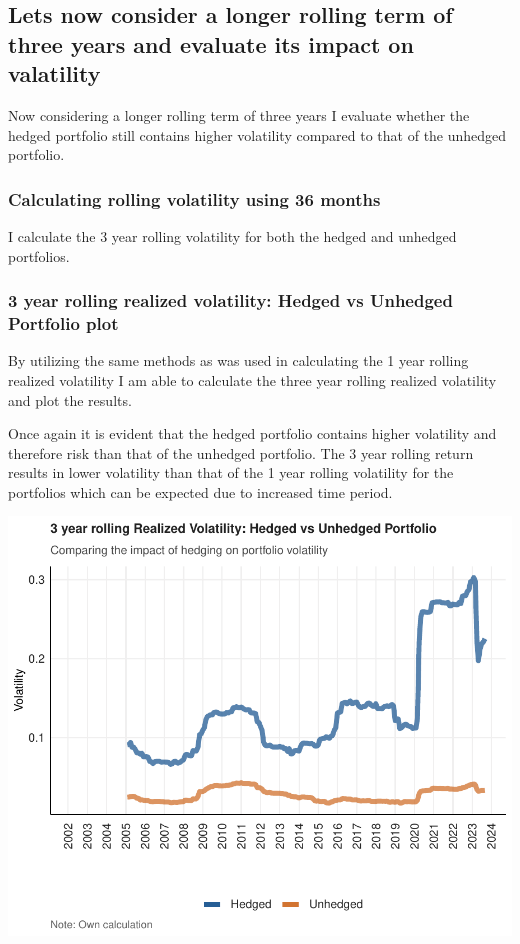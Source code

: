 \documentclass[11pt,preprint, authoryear]{elsarticle}
\numberwithin{equation}{section}
\numberwithin{figure}{section}
\numberwithin{table}{section}
\begin{document}
\hypertarget{lets-now-consider-a-longer-rolling-term-of-three-years-and-evaluate-its-impact-on-valatility}{%
\subsection{Lets now consider a longer rolling term of three years and
evaluate its impact on
valatility}\label{lets-now-consider-a-longer-rolling-term-of-three-years-and-evaluate-its-impact-on-valatility}}

Now considering a longer rolling term of three years I evaluate whether
the hedged portfolio still contains higher volatility compared to that
of the unhedged portfolio.

\hypertarget{calculating-rolling-volatility-using-36-months}{%
\subsubsection{Calculating rolling volatility using 36
months}\label{calculating-rolling-volatility-using-36-months}}

I calculate the 3 year rolling volatility for both the hedged and
unhedged portfolios.

\hypertarget{year-rolling-realized-volatility-hedged-vs-unhedged-portfolio-plot}{%
\subsubsection{3 year rolling realized volatility: Hedged vs Unhedged
Portfolio
plot}\label{year-rolling-realized-volatility-hedged-vs-unhedged-portfolio-plot}}

By utilizing the same methods as was used in calculating the 1 year
rolling realized volatility I am able to calculate the three year
rolling realized volatility and plot the results.

Once again it is evident that the hedged portfolio contains higher
volatility and therefore risk than that of the unhedged portfolio. The 3
year rolling return results in lower volatility than that of the 1 year
rolling volatility for the portfolios which can be expected due to
increased time period.

\includegraphics{Question-2_files/figure-latex/unnamed-chunk-8-1.pdf}
\end{document}
